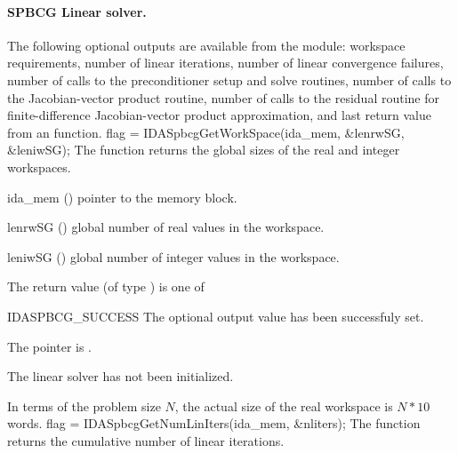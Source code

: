 %
%
\noindent\paragraph{\bf SPBCG Linear solver.}
The following optional outputs are available from the {\idaspbcg} module:
workspace requirements, number of linear iterations,
number of linear convergence failures, number of calls to the preconditioner
setup and solve routines, number of calls to the Jacobian-vector product routine,
 number of calls to the residual routine for finite-difference  Jacobian-vector
 product approximation, and last return value from an {\idaspbcg} function.
{
  flag = IDASpbcgGetWorkSpace(ida\_mem, \&lenrwSG, \&leniwSG);
}
{
  The function  returns the global sizes of
  the {\idaspbcg} real and integer workspaces.
}
{
  \begin{args}[lenrwSG]
  \item[ida\_mem] ()
    pointer to the {\ida} memory block.
  \item[lenrwSG] ()
    global number of real values in the {\idaspbcg} workspace.
  \item[leniwSG] ()
    global number of integer values in the {\idaspbcg} workspace.
  \end{args}
}
{
  The return value  (of type ) is one of
  \begin{args}
  \item[IDASPBCG\_SUCCESS] 
    The optional output value has been successfuly set.
  \item[\Id{IDASPBCG\_MEM\_NULL}]
    The  pointer is .
  \item[\Id{IDASPBCG\_LMEM\_NULL}]
    The {\idaspgmr} linear solver has not been initialized.
  \end{args}
}
{
  In terms of the problem size $N$, the actual size of the real workspace is
  $N*10$  words.
}
{
  flag = IDASpbcgGetNumLinIters(ida\_mem, \&nliters);
}
{
  The function  returns the
  cumulative number of linear iterations.
}
